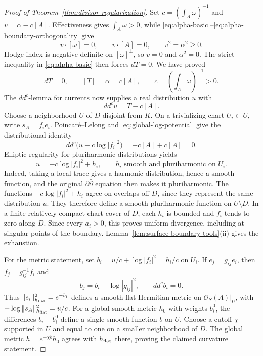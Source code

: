 \documentclass[11pt]{amsart}
\theoremstyle{definition}
\theoremstyle{remark}
\numberwithin{equation}{section}
\newcommand{\OO}{\mathcal O}
\newcommand{\ddc}{dd^c}
\begin{document}
\begin{proof}[Proof of Theorem~\ref{thm:divisor-regularization}]
Set $c=(\int_A\omega)^{-1}$ and $v=\alpha-c[A]$.
Effectiveness gives $\int_A\omega>0$, while
\eqref{eq:alpha-basic}--\eqref{eq:alpha-boundary-orthogonality} give
\[
 v\cdot[\omega]=0,\qquad v\cdot[A]=0,\qquad v^2=\alpha^2\ge0.
\]
Hodge index is negative definite on $[\omega]^\perp$, so $v=0$
and $\alpha^2=0$. The strict inequality in
\eqref{eq:alpha-basic} then forces $dT=0$. We have proved
\begin{equation}\label{eq:closed-current-null-class}
 dT=0,\qquad [T]=\alpha=c[A],\qquad
 c=\left(\int_A\omega\right)^{-1}>0.
\end{equation}
The $dd^c$-lemma for currents now supplies a real distribution $u$ with
\begin{equation}\label{eq:global-log-potential}
 \ddc u=T-c[A].
\end{equation}
Choose a neighborhood $U$ of $D$ disjoint from $K$.
On a trivializing chart $U_i\subset U$, write
$s_A=f_i e_i$. Poincar\'e--Lelong and
\eqref{eq:global-log-potential} give the distributional identity
\[
 \ddc\bigl(u+c\log|f_i|^2\bigr)
 =-c[A]+c[A]=0.
\]
Elliptic regularity
for pluriharmonic distributions yields
\begin{equation}\label{eq:local-log-collar}
 u=-c\log|f_i|^2+h_i,
 \qquad h_i\text{ smooth and pluriharmonic on }U_i.
\end{equation}
Indeed, taking a local trace gives a harmonic distribution, hence a
smooth function, and the original $\partial\bar\partial$ equation
then makes it pluriharmonic. The functions $-c\log|f_i|^2+h_i$
agree on overlaps off $D$, since they represent the same distribution $u$.
They therefore define a smooth pluriharmonic function on
$U\setminus D$. In a finite relatively compact chart cover of $D$,
each $h_i$ is bounded and $f_i$ tends to zero along $D$. Since
every $a_i>0$, this proves uniform divergence, including at singular
points of the boundary.
Lemma~\ref{lem:surface-boundary-tools}\textup{(ii)} gives the exhaustion.

For the metric statement, set
$b_i=u/c+\log|f_i|^2=h_i/c$ on $U_i$.
If $e_j=g_{ij}e_i$, then $f_j=g_{ij}^{-1}f_i$ and
\[
 b_j=b_i-\log|g_{ij}|^2,\qquad \ddc b_i=0.
\]
Thus $\|e_i\|_{h_{\rm flat}}^2=e^{-b_i}$ defines a smooth flat
Hermitian metric on $\OO_S(A)|_U$, with
$-\log\|s_A\|_{h_{\rm flat}}^2=u/c$.
For a global smooth metric $h_0$ with weights $b_i^0$, the
differences $b_i-b_i^0$ define a single smooth function $b$ on $U$.
Choose a cutoff $\chi$ supported in $U$ and equal to one on a
smaller neighborhood of $D$. The global metric
$h=e^{-\chi b}h_0$ agrees with $h_{\rm flat}$ there, proving the
claimed curvature statement.
\end{proof}
\end{document}
